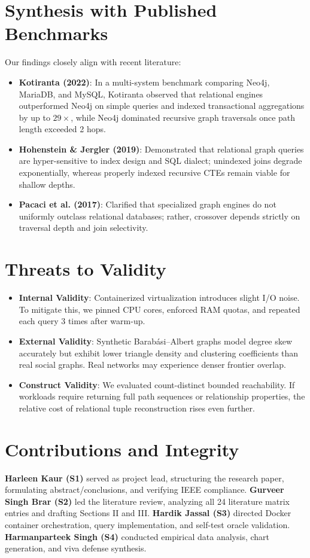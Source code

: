 \documentclass[conference,10pt]{IEEEtran}%
\begin{document}
\section{Synthesis with Published Benchmarks}
Our findings closely align with recent literature:
\begin{itemize}
    \item \textbf{Kotiranta (2022)}: In a multi-system benchmark comparing Neo4j, MariaDB, and MySQL, Kotiranta observed that relational engines outperformed Neo4j on simple queries and indexed transactional aggregations by up to $29\times$, while Neo4j dominated recursive graph traversals once path length exceeded 2 hops.
    \item \textbf{Hohenstein \& Jergler (2019)}: Demonstrated that relational graph queries are hyper-sensitive to index design and SQL dialect; unindexed joins degrade exponentially, whereas properly indexed recursive CTEs remain viable for shallow depths.
    \item \textbf{Pacaci et al. (2017)}: Clarified that specialized graph engines do not uniformly outclass relational databases; rather, crossover depends strictly on traversal depth and join selectivity.
\end{itemize}

\section{Threats to Validity}
\begin{itemize}
    \item \textbf{Internal Validity}: Containerized virtualization introduces slight I/O noise. To mitigate this, we pinned CPU cores, enforced RAM quotas, and repeated each query 3 times after warm-up.
    \item \textbf{External Validity}: Synthetic Barab\'asi--Albert graphs model degree skew accurately but exhibit lower triangle density and clustering coefficients than real social graphs. Real networks may experience denser frontier overlap.
    \item \textbf{Construct Validity}: We evaluated count-distinct bounded reachability. If workloads require returning full path sequences or relationship properties, the relative cost of relational tuple reconstruction rises even further.
\end{itemize}

\section{Contributions and Integrity}
\textbf{Harleen Kaur (S1)} served as project lead, structuring the research paper, formulating abstract/conclusions, and verifying IEEE compliance.
\textbf{Gurveer Singh Brar (S2)} led the literature review, analyzing all 24 literature matrix entries and drafting Sections II and III.
\textbf{Hardik Jassal (S3)} directed Docker container orchestration, query implementation, and self-test oracle validation.
\textbf{Harmanparteek Singh (S4)} conducted empirical data analysis, chart generation, and viva defense synthesis.
\end{document}
